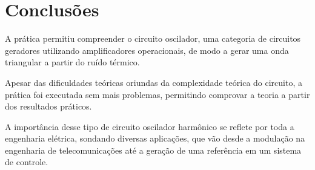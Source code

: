\section{Conclusões}

A prática permitiu compreender o circuito oscilador, uma categoria de circuitos geradores utilizando amplificadores operacionais, de modo a gerar uma onda triangular a partir do ruído térmico.

Apesar das dificuldades teóricas oriundas da complexidade teórica do circuito, a prática foi executada sem mais problemas, permitindo comprovar a teoria a partir dos resultados práticos.

A importância desse tipo de circuito oscilador harmônico se reflete por toda a engenharia elétrica, sondando diversas aplicações, que vão desde a modulação na engenharia de telecomunicações até a geração de uma referência em um sistema de controle.



